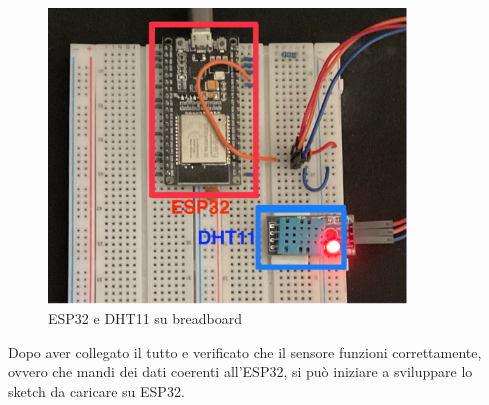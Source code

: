 \begin{figure}[H]
    \begin{center}
        \includegraphics[width=0.85\textwidth]{img/esp32dht11}
    \end{center}
    \label{esp32dht11}
    \caption{ESP32 e DHT11 su breadboard}
\end{figure}
Dopo aver collegato il tutto e verificato che il sensore funzioni correttamente, ovvero che mandi dei dati
coerenti all'ESP32, si può iniziare a sviluppare lo sketch da caricare su ESP32.

